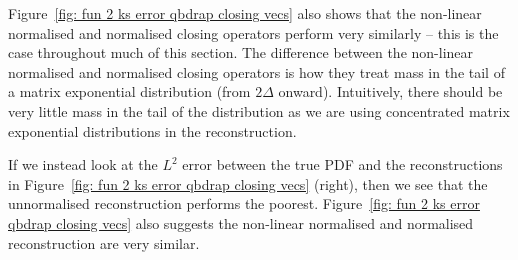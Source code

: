 \begin{example}
	Figure~\ref{fig: fun 2 ks error qbdrap closing vecs} also shows that the non-linear normalised and normalised closing operators perform very similarly -- this is the case throughout much of this section. The difference between the non-linear normalised and normalised closing operators is how they treat mass in the tail of a matrix exponential distribution (from \(2\Delta\) onward). Intuitively, there should be very little mass in the tail of the distribution as we are using concentrated matrix exponential distributions in the reconstruction. 

If we instead look at the \(L^2\) error between the true PDF and the reconstructions in Figure~\ref{fig: fun 2 ks error qbdrap closing vecs} (right), then we see that the unnormalised reconstruction performs the poorest. Figure~\ref{fig: fun 2 ks error qbdrap closing vecs} also suggests the non-linear normalised and normalised reconstruction are very similar. 
\end{example}

